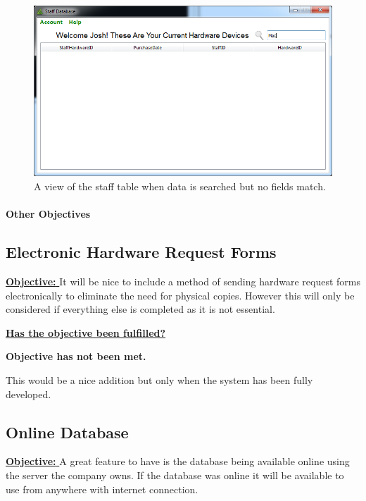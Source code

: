 \begin{figure}[H]
    \includegraphics[width=\textwidth]{./Evaluation/Images/staffsearch2.png}
    \caption{A view of the staff table when data is searched but no fields match.} 
\end{figure}


\paragraph{Other Objectives}

\subsection{Electronic Hardware Request Forms}

\underline{\textbf{Objective:} } It will be nice to include a method of sending hardware request forms electronically to eliminate the need for physical copies. However this will only be considered if everything else is completed as it is not essential.

\underline{\textbf{Has the objective been fulfilled?}}

\textbf{Objective has not been met.}

This would be a nice addition but only when the system has been fully developed.



\subsection{Online Database}

\underline{\textbf{Objective:} } A great feature to have is the database being available online using the server the company owns. If the database was online it will be available to use from anywhere with internet connection.

